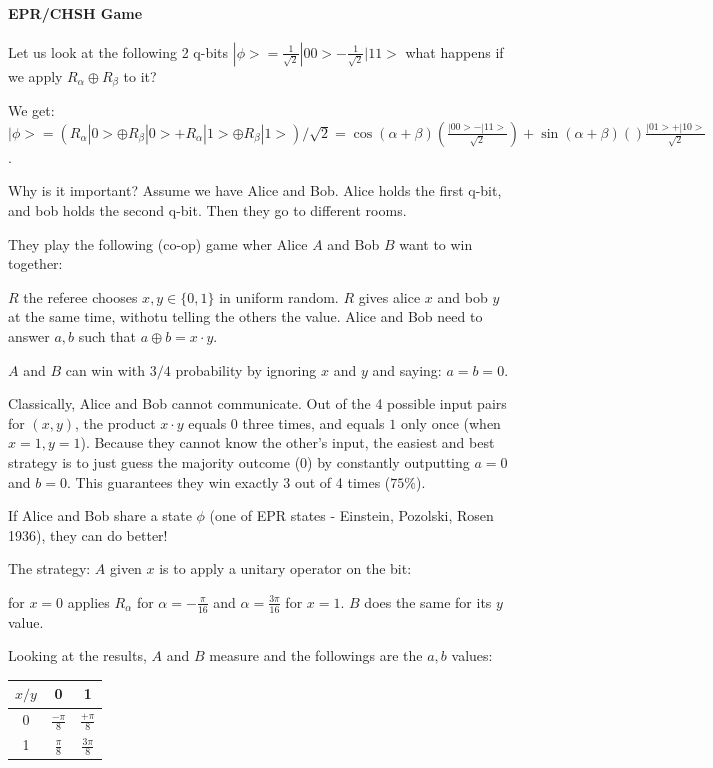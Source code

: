 \paragraph{EPR/CHSH Game}
Let us look at the following 2 q-bits
$|\phi>=\frac{1}{\sqrt{2}}|00>-\frac{1}{\sqrt{2}}|11>$
what happens if we apply $R_\alpha\oplus R_\beta$ to it?

We get:
$|\phi>=(R_\alpha|0>\oplus R_\beta|0>+R_\alpha|1>\oplus R_\beta|1>)/ \sqrt{2}=\cos(\alpha+\beta)(\frac{|00>-|11>}{\sqrt{2}})+\sin(\alpha+\beta)()\frac{|01>+|10>}{\sqrt{2}}$.

Why is it important?
Assume we have Alice and Bob. Alice holds the first q-bit, and bob holds the second q-bit. Then they go to different rooms. 

They play the following (co-op) game wher Alice $A$ and Bob $B$ want to win together: 

$R$ the referee chooses $x,y\in\{0,1\}$ in uniform random. $R$ gives alice $x$ and bob $y$ at the same time, withotu telling the others the value. 
Alice and Bob need to answer $a,b$ such that 
$a\oplus b=x\cdot y$.

$A$ and $B$ can win with $3/4$ probability by ignoring $x$ and $y$ and saying: $a=b=0$.
\begin{insight}
    Classically, Alice and Bob cannot communicate. Out of the 4 possible input pairs for $(x,y)$, the product $x \cdot y$ equals $0$ three times, and equals $1$ only once (when $x=1, y=1$). 
    Because they cannot know the other's input, the easiest and best strategy is to just guess the majority outcome ($0$) by constantly outputting $a=0$ and $b=0$. This guarantees they win exactly 3 out of 4 times ($75\%$).
\end{insight}


If Alice and Bob share a state $\phi$ (one of EPR states - Einstein, Pozolski, Rosen 1936), they can do better!

The strategy: $A$ given $x$ is to apply a unitary operator on the bit:

for $x=0$ applies $R_\alpha$ for $\alpha=-\frac{\pi}{16}$ and $\alpha=\frac{3\pi}{16}$ for $x=1$.
$B$ does the same for its $y$ value.

Looking at the results, $A$ and $B$ measure and the followings are the $a,b$ values:

\begin{center}
\begin{tabular}{c|c|c}
$x/y$ & 0 & 1 \\
\hline
0 & $\frac{-\pi}{8}$ & $\frac{+\pi}{8}$ \\
1 & $\frac{\pi}{8}$ & $\frac{3\pi}{8}$ \\
\end{tabular}
\end{center}

